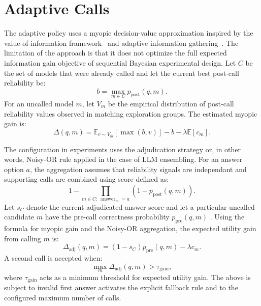 \documentclass[11pt]{article}
\begin{document}
\section{Adaptive Calls}

The adaptive policy uses a myopic decision-value approximation inspired by the value-of-information framework~\citep{howard1966information} and adaptive information gathering~\citep{choudhury2026bedllm}. 
The limitation of the approach is that it does not optimize the full expected information gain objective of sequential Bayesian experimental design.
Let $C$ be the set of models that were already called and let the current best post-call reliability be:
\begin{equation*}
b=\max_{m\in C}p_{\mathrm{post}}(q,m).
\end{equation*}
For an uncalled model $m$, let $V_m$ be the empirical distribution of post-call reliability values observed in matching exploration groups. The estimated myopic gain is:
\begin{equation*}
\Delta(q,m)
=
\mathbb{E}_{v\sim V_m}[\max(b,v)]
-b
-\lambda\mathbb{E}[c_m].
\end{equation*}

The configuration in experiments uses the adjudication strategy or, in other words, Noisy-OR rule \cite{pearl1988probabilistic} applied in the case of LLM ensembling. 
For an answer option $a$, the aggregation assumes that reliability signals are independant and supporting calls are combined using score defined as:
\begin{equation*}
1-\prod_{m\in C:\,\operatorname{answer}_m=a}
\left(1-p_{\mathrm{post}}(q,m)\right).
\end{equation*}
Let $s_C$ denote the current adjudicated answer score and let a particular uncalled candidate $m$ have the pre-call correctness probability $p_{\mathrm{pre}}(q,m)$ .
Using the formula for myopic gain and the Noisy-OR aggregation, the expected utility gain from calling $m$ is:
\begin{equation*}
\Delta_{\mathrm{adj}}(q,m)
=
(1-s_C)p_{\mathrm{pre}}(q,m)
-\lambda c_m.
\end{equation*}
A second call is accepted when:
\begin{equation*}
\max_m\Delta_{\mathrm{adj}}(q,m)>\tau_{\mathrm{gain}},
\end{equation*}
where $\tau_{\mathrm{gain}}$ acts as a minimum threshold for expected utility gain.
The above is subject to invalid first answer activates the explicit fallback rule and to the configured maximum number of calls. 
\end{document}

